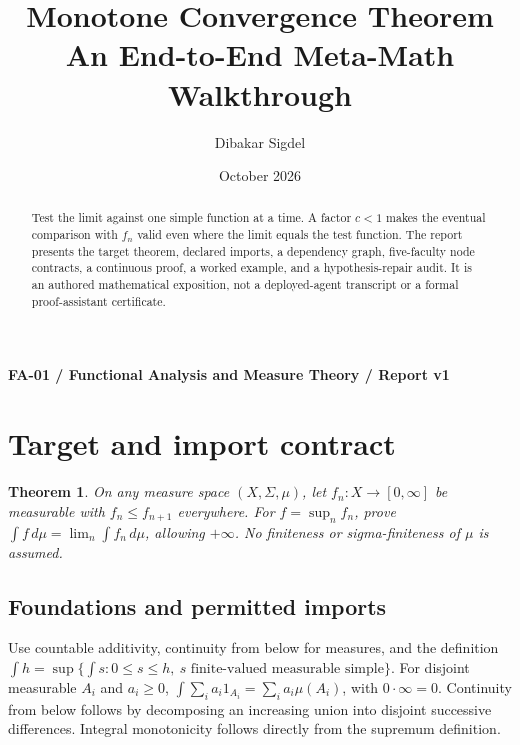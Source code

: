 \documentclass[preprint,12pt,aps,pra,showkeys,amsmath,amssymb,superscriptaddress,floatfix]{revtex4-2}
\newtheorem{theorem}{Theorem}[section]
\theoremstyle{definition}
\theoremstyle{remark}
\begin{document}
\title{Monotone Convergence Theorem\\[4pt]\large An End-to-End Meta-Math Walkthrough}

\author{Dibakar Sigdel}


\date{October 2026}

\begin{abstract}

Test the limit against one simple function at a time. A factor \(c<1\)
makes the eventual comparison with \(f_n\) valid even where the limit
equals the test function. The report presents the target theorem,
declared imports, a dependency graph, five-faculty node contracts, a
continuous proof, a worked example, and a hypothesis-repair audit. It is
an authored mathematical exposition, not a deployed-agent transcript or
a formal proof-assistant certificate.

\end{abstract}\maketitle\linespread{1.12}\selectfont

\noindent\textbf{FA-01 / Functional Analysis and Measure Theory / Report v1}

\section{Target and import contract}

\begin{theorem}

On any measure space \((X,\Sigma,\mu)\), let \(f_n:X\to[0,\infty]\) be
measurable with \(f_n\le f_{n+1}\) everywhere. For \(f=\sup_n f_n\),
prove \(\int f\,d\mu=\lim_n\int f_n\,d\mu\), allowing \(+\infty\). No
finiteness or sigma-finiteness of \(\mu\) is assumed.

\end{theorem}

\subsection{Foundations and permitted imports}

Use countable additivity, continuity from below for measures, and the
definition
\(\int h=\sup\{\int s:0\le s\le h,\ s\text{ finite-valued measurable simple}\}\).
For disjoint measurable \(A_i\) and \(a_i\ge0\),
\(\int\sum_i a_i1_{A_i}=\sum_i a_i\mu(A_i)\), with \(0\cdot\infty=0\).
Continuity from below follows by decomposing an increasing union into
disjoint successive differences. Integral monotonicity follows directly
from the supremum definition.
\end{document}
